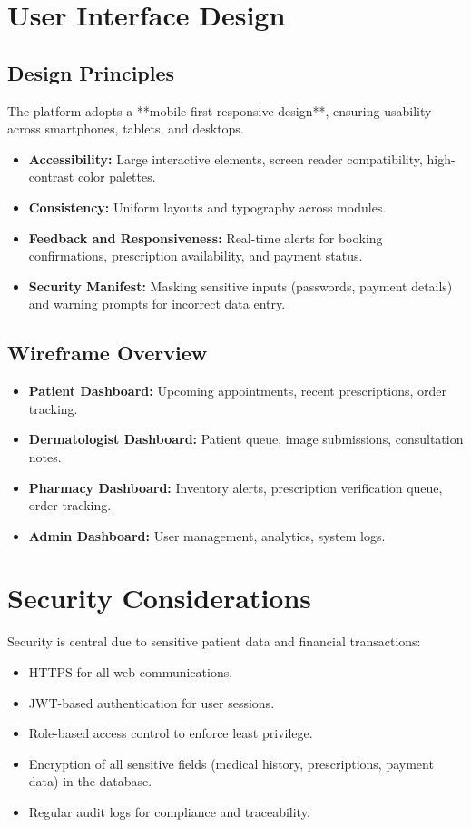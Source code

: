 \documentclass[12pt,a4paper]{report}
\begin{document}
\section{User Interface Design}
\subsection{Design Principles}
The platform adopts a **mobile-first responsive design**, ensuring usability across smartphones, tablets, and desktops.

\begin{itemize}
    \item \textbf{Accessibility:} Large interactive elements, screen reader compatibility, high-contrast color palettes.
    \item \textbf{Consistency:} Uniform layouts and typography across modules.
    \item \textbf{Feedback and Responsiveness:} Real-time alerts for booking confirmations, prescription availability, and payment status.
    \item \textbf{Security Manifest:} Masking sensitive inputs (passwords, payment details) and warning prompts for incorrect data entry.
\end{itemize}

\subsection{Wireframe Overview}
\begin{itemize}
    \item \textbf{Patient Dashboard:} Upcoming appointments, recent prescriptions, order tracking.
    \item \textbf{Dermatologist Dashboard:} Patient queue, image submissions, consultation notes.
    \item \textbf{Pharmacy Dashboard:} Inventory alerts, prescription verification queue, order tracking.
    \item \textbf{Admin Dashboard:} User management, analytics, system logs.
\end{itemize}

\section{Security Considerations}
Security is central due to sensitive patient data and financial transactions:
\begin{itemize}
    \item HTTPS for all web communications.
    \item JWT-based authentication for user sessions.
    \item Role-based access control to enforce least privilege.
    \item Encryption of all sensitive fields (medical history, prescriptions, payment data) in the database.
    \item Regular audit logs for compliance and traceability.
\end{itemize}
\end{document}
